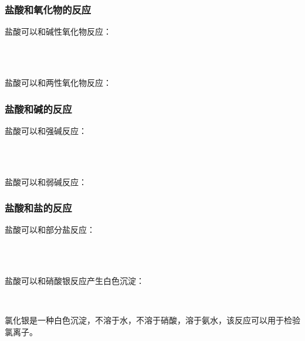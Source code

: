 \documentclass[UTF8]{ctexart}
\begin{document}
\subsubsection{盐酸和氧化物的反应}
    盐酸可以和碱性氧化物反应：
    \begin{center}
        \\[3mm]
        \\[6mm]
    \end{center}
    盐酸可以和两性氧化物反应：
    \begin{center}
    \end{center}\vspace{5pt}

\subsubsection{盐酸和碱的反应}
    盐酸可以和强碱反应：
    \begin{center}
        \\[3mm]
        \\[6mm]
    \end{center}
    盐酸可以和弱碱反应：
    \begin{center}
    \end{center}\vspace{5pt}

\subsubsection{盐酸和盐的反应}
    盐酸可以和部分盐反应：
    \begin{center}
        \\[3mm]
        \\[6mm]
    \end{center}
    盐酸可以和硝酸银反应产生白色沉淀：
    \begin{center}
        \\[6mm]
    \end{center}
    氯化银是一种白色沉淀，不溶于水，不溶于硝酸，溶于氨水，该反应可以用于检验氯离子。

\newpage
\end{document}
